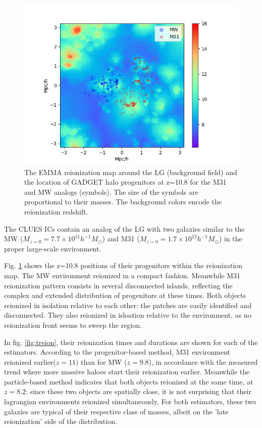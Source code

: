 \documentclass[twocolumn]{aastex61}
\begin{document}
\begin{figure}[ht]
\includegraphics[width=1.2\columnwidth]{img/map_LG.png}
\caption{The EMMA reionization map around the LG (background field) and the location of GADGET halo progenitors at z=10.8 for the M31 and MW analogs (symbols). The size of the symbols are proportional to their masses. The background colors encode the reionization redshift.}
\label{fig:LG}
\end{figure}

The CLUES ICs contain an analog of the LG with two galaxies similar to the MW ($M_{z=0}=7.7\times 10^{11} h^{-1} M_\odot$) and M31 ($M_{z=0}=1.7 \times 10^{12} h^{-1} M_\odot$) in the proper large-scale environment.

Fig. \ref{fig:LG} shows the z=10.8 positions of their progenitors within the reionization map. The MW environment reionized in a compact fashion. Meanwhile M31 reionization pattern consists in several disconnected islands, reflecting the complex and extended distribution of progenitors at these times. Both objects reionized in isolation relative to each other: the patches are easily identified and disconnected. They also reionized in isloation relative to the environment, as no reionization front seems to sweep the region.

In fig. \ref{fig:treion}, their reionization times and durations are shown for each of the estimators. According to the progenitor-based method, M31 environment reionized earlier($z=11$) than for MW ($z=9.8$), in accordance with the measured trend where more massive haloes start their reionization earlier. Meanwhile the particle-based method indicates that both objects reionized at the same time, at $z=8.2$: since these two objects are spatially close, it is not surprising that their lagrangian environments reionized simultaneously. For both estimators, these two galaxies are typical of their respective class of masses, albeit on the 'late reionization' side of the distribution. 
\end{document}
